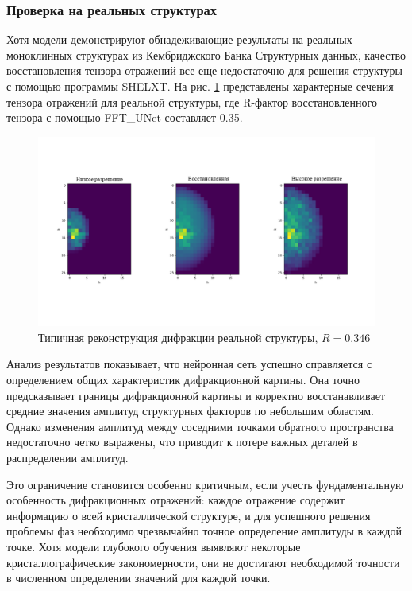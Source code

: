\subsubsection{Проверка на реальных структурах}

Хотя модели демонстрируют обнадеживающие результаты на реальных моноклинных структурах из Кембриджского Банка Структурных данных, качество восстановления тензора отражений все еще недостаточно для решения структуры с помощью программы SHELXT. На рис. \ref{recon_ex} представлены характерные сечения тензора отражений для реальной структуры, где R-фактор восстановленного тензора с помощью FFT\_UNet составляет 0.35.

\begin{figure}[H]
    \centering
    \includegraphics[width=1\textwidth]{figures/real.png}
    \caption{Типичная реконструкция дифракции реальной структуры, $R = 0.346$}
    \label{recon_ex}
\end{figure}

Анализ результатов показывает, что нейронная сеть успешно справляется с определением общих характеристик дифракционной картины. Она точно предсказывает границы дифракционной картины и корректно восстанавливает средние значения амплитуд структурных факторов по небольшим областям. Однако изменения амплитуд между соседними точками обратного пространства недостаточно четко выражены, что приводит к потере важных деталей в распределении амплитуд. 

Это ограничение становится особенно критичным, если учесть фундаментальную особенность дифракционных отражений: каждое отражение содержит информацию о всей кристаллической структуре, и для успешного решения проблемы фаз необходимо чрезвычайно точное определение амплитуды в каждой точке. Хотя модели глубокого обучения выявляют некоторые кристаллографические закономерности, они не достигают необходимой точности в численном определении значений для каждой точки.

